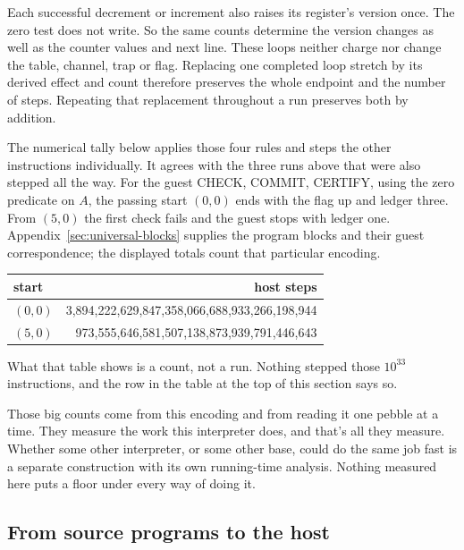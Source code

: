 \documentclass[11pt,twoside]{article}
\theoremstyle{thielethm}
\theoremstyle{thieledef}
\theoremstyle{thieledef}
\theoremstyle{thieledef}
\theoremstyle{thielethm}
\theoremstyle{thieleobs}
\theoremstyle{thielethm}
\begin{document}
Each successful decrement or increment also raises its register's version once.
The zero test does not write. So the same counts determine the version changes as well
as the counter values and next line. These loops neither charge nor change the table,
channel, trap or flag. Replacing one completed loop stretch by its derived effect and
count therefore preserves the whole endpoint and the number of steps. Repeating that
replacement throughout a run preserves both by addition.

The numerical tally below applies those four rules and steps the other instructions
individually. It agrees with the three runs above that were also stepped all the way.
For the guest CHECK, COMMIT, CERTIFY, using the zero predicate on $A$, the passing start
$(0,0)$ ends with the flag up and ledger three. From $(5,0)$ the first check fails and
the guest stops with ledger one. Appendix~\ref{sec:universal-blocks} supplies the program
blocks and their guest correspondence; the displayed totals count that particular encoding.

\begin{center}
\small
\begin{tabular}{@{}lr@{}}
start & host steps \\ \hline
$(0,0)$ & 3,894,222,629,847,358,066,688,933,266,198,944 \\
$(5,0)$ & 973,555,646,581,507,138,873,939,791,446,643 \\
\end{tabular}
\end{center}

What that table shows is a count, not a run. Nothing stepped those $10^{33}$ instructions, and the row in the table
at the top of this section says so.

Those big counts come from this encoding and from reading it one pebble at a time. They
measure the work this interpreter does, and that's all they measure. Whether some other
interpreter, or some other base, could do the same job fast is a separate construction with its
own running-time analysis. Nothing measured here puts a floor under every way of doing it.

\subsection{From source programs to the host}
\end{document}
